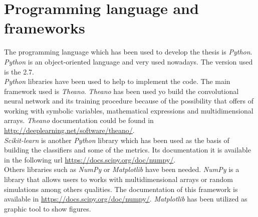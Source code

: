 \section{Programming language and frameworks}
The  programming language which has been used to develop the thesis is \textit{Python}. \textit{Python} is an object-oriented language and very used nowadays. The version used is the 2.7.\\

\textit{Python} libraries have been used to help to implement the code. The main framework used is \textit{Theano}. \textit{Theano} has been used yo build the convolutional neural network and its training procedure because of the possibility that offers of working with symbolic variables, mathematical expressions and multidimensional arrays. \textit{Theano} documentation could be found in \url{http://deeplearning.net/software/theano/}.\\

\textit{Scikit-learn} is another \textit{Python} library which has been used as the basis of building the classifiers and some of the metrics. Its documentation it is available in the following url \url{https://docs.scipy.org/doc/numpy/}.\\

Others libraries such as \textit{NumPy} or \textit{Matplotlib} have been needed. \textit{NumPy} is a library that allows users to works with multidimensional arrays or random simulations among others qualities. The documentation of this framework is available in \url{https://docs.scipy.org/doc/numpy/}. \textit{Matplotlib} has been utilized as graphic tool to show figures.\\
